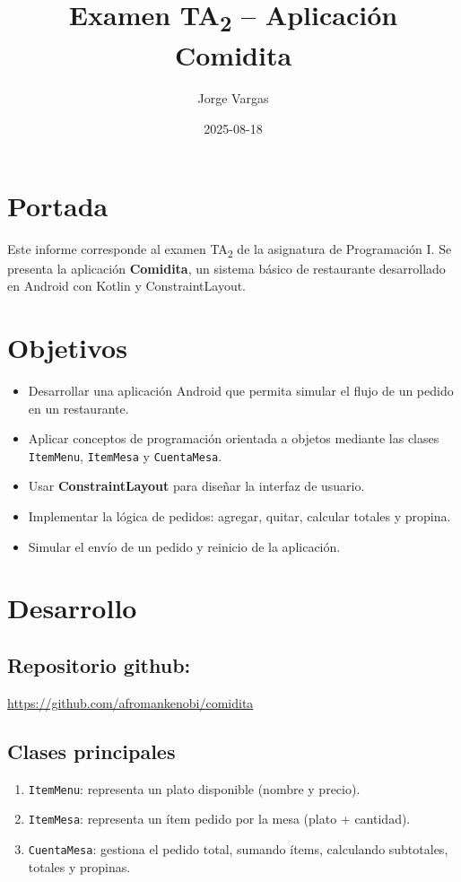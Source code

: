 \documentclass[11pt,a4paper]{article}
\author{Jorge Vargas}
\date{2025-08-18}
\title{Examen TA\textsubscript{2} – Aplicación \guillemotleft{}Comidita\guillemotright{}}
\begin{document}
\maketitle
\section{Portada}
\label{sec:orgd60c0ec}
Este informe corresponde al examen TA\textsubscript{2} de la asignatura de Programación I.
Se presenta la aplicación \textbf{Comidita}, un sistema básico de restaurante desarrollado en Android con Kotlin y ConstraintLayout.
\section{Objetivos}
\label{sec:org4faa52f}
\begin{itemize}
\item Desarrollar una aplicación Android que permita simular el flujo de un pedido en un restaurante.
\item Aplicar conceptos de programación orientada a objetos mediante las clases \texttt{ItemMenu}, \texttt{ItemMesa} y \texttt{CuentaMesa}.
\item Usar \textbf{ConstraintLayout} para diseñar la interfaz de usuario.
\item Implementar la lógica de pedidos: agregar, quitar, calcular totales y propina.
\item Simular el envío de un pedido y reinicio de la aplicación.
\end{itemize}
\section{Desarrollo}
\label{sec:org7d87b0e}
\subsection{Repositorio github:}
\label{sec:orgf15e67e}
\url{https://github.com/afromankenobi/comidita}
\subsection{Clases principales}
\label{sec:orgd2a951e}
\begin{enumerate}
\item \texttt{ItemMenu}: representa un plato disponible (nombre y precio).
\item \texttt{ItemMesa}: representa un ítem pedido por la mesa (plato + cantidad).
\item \texttt{CuentaMesa}: gestiona el pedido total, sumando ítems, calculando subtotales, totales y propinas.
\end{enumerate}
\end{document}

